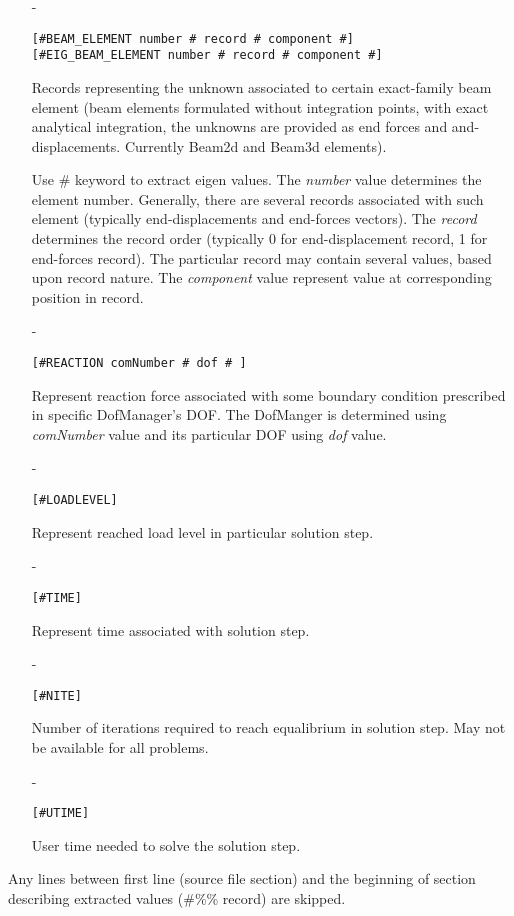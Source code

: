 \begin{itemize}
The {\em keyword} is used only when status records are requested,
i.e., when 'record' is equal to 2. The {\em keyword} is followed by a quoted string, that determines the name of status variable, values of which are requested.The element integration point status record is assumed to have the following form:
status {name1 val1 val2 ....  name2 val1 val2 ....  }
Each variable is assumed to be followed by array of values, and the value of {\em  component} value can be used to extract the value at corresponding position.


\item[-]
\begin{verbatim}
[#BEAM_ELEMENT number # record # component #]
[#EIG_BEAM_ELEMENT number # record # component #]
\end{verbatim}
Records representing the unknown associated to certain exact-family beam
element (beam elements formulated without integration points, with
exact analytical integration, the unknowns are provided as end forces
and and-displacements. Currently Beam2d and Beam3d elements). 

Use \# keyword  to extract eigen
values. The {\em number} value determines the element number.
Generally, there are several records associated with such element
(typically end-displacements  and end-forces vectors). 
The {\em record} determines the record order (typically 0 for end-displacement record, 1 for end-forces
record). The particular record may contain several values, based upon
record nature. The {\em  component} value represent value at corresponding position
in record. 
\item[-]
\begin{verbatim}
[#REACTION comNumber # dof # ]
\end{verbatim}
Represent reaction force associated with some boundary condition
prescribed in specific DofManager's DOF. The DofManger is determined
using {\em comNumber} value and its particular DOF using {\em dof} value.
\item[-]
\begin{verbatim}
[#LOADLEVEL]
\end{verbatim}
Represent reached load level in particular solution step.
\item[-]
\begin{verbatim}
[#TIME]
\end{verbatim}
Represent time associated with solution step.
\item[-]
\begin{verbatim}
[#NITE]
\end{verbatim}
Number of iterations required to reach equalibrium in solution
step. May not be available for all problems.
\item[-]
\begin{verbatim}
[#UTIME]
\end{verbatim}
User time needed to solve the solution step. 
\end{itemize}
Any lines between first line (source file section) and the beginning
of section describing extracted values (\#\%\% record) are
skipped. 

